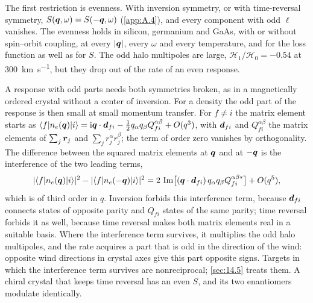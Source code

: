 The first restriction is evenness. With inversion symmetry, or with time-reversal symmetry, $S(\bm{q},\omega) = S(-\bm{q},\omega)$ (\cref{app:A.4}), and every component with odd $\ell$ vanishes. The evenness holds in silicon, germanium and GaAs, with or without spin--orbit coupling, at every $|\bm{q}|$, every $\omega$ and every temperature, and for the loss function as well as for $S$. The odd halo multipoles are large, $\mathcal{H}_1/\mathcal{H}_0 = -0.54$ at \SI{300}{km.s^{-1}}, but they drop out of the rate of an even response.

A response with odd parts needs both symmetries broken, as in a magnetically ordered crystal without a center of inversion. For a density the odd part of the response is then small at small momentum transfer. For $f \ne i$ the matrix element starts as $\langle f|n_e(\bm{q})|i\rangle = \mathrm{i}\bm{q}\cdot\bm{d}_{fi} - \tfrac12q_\alpha q_\beta Q^{\alpha\beta}_{fi} + O(q^3)$, with $\bm{d}_{fi}$ and $Q^{\alpha\beta}_{fi}$ the matrix elements of $\sum_j\bm{r}_j$ and $\sum_jr^\alpha_jr^\beta_j$; the term of order zero vanishes by orthogonality. The difference between the squared matrix elements at $\bm{q}$ and at $-\bm{q}$ is the interference of the two leading terms,
\begin{equation*}
  |\langle f|n_e(\bm{q})|i\rangle|^2 - |\langle f|n_e(-\bm{q})|i\rangle|^2 = 2\,\operatorname{Im}\bigl[(\bm{q}\cdot\bm{d}_{fi})\,q_\alpha q_\beta Q^{\alpha\beta*}_{fi}\bigr] + O(q^5) ,
\end{equation*}
which is of third order in $q$. Inversion forbids this interference term, because $\bm{d}_{fi}$ connects states of opposite parity and $Q_{fi}$ states of the same parity; time reversal forbids it as well, because time reversal makes both matrix elements real in a suitable basis. Where the interference term survives, it multiplies the odd halo multipoles, and the rate acquires a part that is odd in the direction of the wind: opposite wind directions in crystal axes give this part opposite signs. Targets in which the interference term survives are nonreciprocal; \cref{sec:14.5} treats them. A chiral crystal that keeps time reversal has an even $S$, and its two enantiomers modulate identically.

